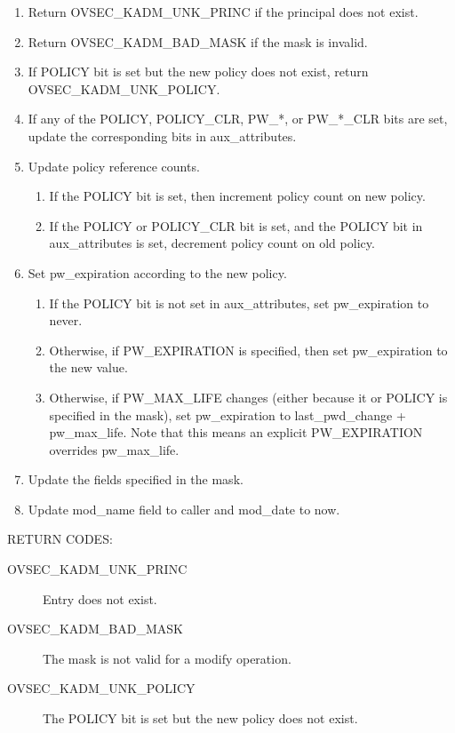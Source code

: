 \begin{enumerate}
\item Return OVSEC_KADM_UNK_PRINC if the principal does not exist.
\item Return OVSEC_KADM_BAD_MASK if the mask is invalid.
\item If POLICY bit is set but the new policy does not exist, return
OVSEC_KADM_UNK_POLICY.
\item If any of the POLICY, POLICY_CLR, PW_*, or PW_*_CLR bits are
set, update the corresponding bits in aux_attributes.

\item Update policy reference counts.
\begin{enumerate}
\item If the POLICY bit is set, then increment policy count on new
policy.
\item If the POLICY or POLICY_CLR bit is set, and the POLICY bit in
aux_attributes is set, decrement policy count on old policy.
\end{enumerate}

\item Set pw_expiration according to the new policy.
\begin{enumerate}
\item If the POLICY bit is not set in aux_attributes, set
pw_expiration to never.  
\item Otherwise, if PW_EXPIRATION is specified, then set
pw_expiration to the new value.
\item Otherwise, if PW_MAX_LIFE changes (either because it or POLICY
is specified in the mask), set pw_expiration to last_pwd_change +
pw_max_life.  Note that this means an explicit PW_EXPIRATION overrides
pw_max_life.
\end{enumerate}

\item Update the fields specified in the mask.
\item Update mod_name field to caller and mod_date to now.
\end{enumerate}

RETURN CODES:

\begin{description}
\item[OVSEC_KADM_UNK_PRINC] Entry does not exist.
\item[OVSEC_KADM_BAD_MASK] The mask is not valid for a modify
operation.
\item[OVSEC_KADM_UNK_POLICY] The POLICY bit is set but the new
policy does not exist.
\end{description}

